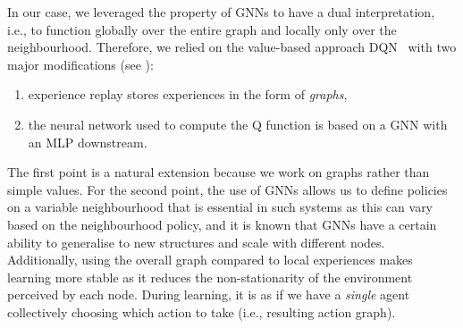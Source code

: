 \documentclass[conference]{IEEEtran}
\begin{document}
In our case, we leveraged the property of \ac{GNN}s to have a dual interpretation, i.e., to function globally over the entire graph and locally only over the neighbourhood. 
%
Therefore, we relied on the value-based approach \ac{DQN}~\cite{mnih2015playing}  with two major modifications (see ): 
\begin{enumerate}
  \item experience replay stores experiences in the form of \emph{graphs},
  \item the neural network used to compute the Q function is based on a \ac{GNN} with an \ac{MLP} downstream.
\end{enumerate}
The first point is a natural extension because we work on graphs rather than simple values. 
%
For the second point,
 the use of \acp{GNN} allows us to define policies on a variable neighbourhood  that is essential in such systems as this can vary based on the neighbourhood policy,
 and it is known that \acp{GNN} have a certain ability to generalise to new structures and scale with different nodes. 
% 
Additionally, 
 using the overall graph compared to local experiences makes learning more stable as it reduces the non-stationarity of the environment perceived by each node.
% 
 During learning, it is as if we have a \emph{single} agent collectively choosing which action to take (i.e., resulting action graph). 
%
\end{document}

